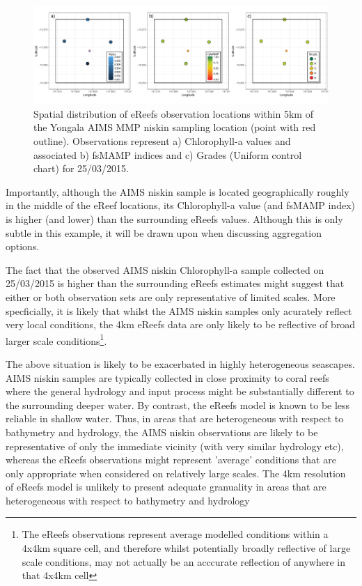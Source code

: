 \begin{figure}[!hptb]
  \includegraphics[width=\textwidth]{figures/FocalAreas/focalArea_Spatial.Yongala_Measure.chl.pdf}
    \caption{Spatial distribution of eReefs observation locations within 5km of the Yongala AIMS MMP niskin sampling location (point with red outline).  Observations represent a) Chlorophyll-a values and associated b) fsMAMP indices and c) Grades (Uniform control chart) for 25/03/2015.}\label{fig:focalArea_Spatial.Yongala_Measure.chl}
\end{figure}

Importantly, although the AIMS niskin sample is located geographically roughly in the middle of the
eReef locations, its Chlorophyll-a value (and fsMAMP index) is higher (and lower) than the surrounding
eReefs values.  Although this is only subtle in this example, it will be drawn upon when discussing
aggregation options.

The fact that the observed AIMS niskin Chlorophyll-a sample collected on 25/03/2015 is
higher than the surrounding eReefs estimates might suggest that either or both observation
sets are only representative of limited scales.  More specficially, it is likely that whilst the
AIMS niskin samples only acurately reflect very local conditions, the 4km eReefs data are
only likely to be reflective of broad larger scale conditions\footnote{The eReefs observations represent
  average modelled conditions within a 4x4km square cell, and therefore whilst potentially broadly reflective
  of large scale conditions, may not actually be an acccurate reflection of anywhere in that 4x4km cell}.

The above situation is likely to be exacerbated in highly heterogeneous seascapes.
AIMS niskin
samples are typically collected in close proximity to coral reefs where the general hydrology
and input process might be substantially different to the surrounding deeper water.  By contrast,
the eReefs model is known to be less reliable in shallow water.  Thus, in areas that are
heterogeneous with respect to bathymetry and hydrology, the AIMS niskin observations are
likely to be representative of only the immediate vicinity (with very similar hydrology etc),
whereas the eReefs observations might represent 'average' conditions that are only appropriate
when considered on relatively large scales. The 4km resolution of eReefs model is unlikely to present adequate granuality in areas that
are heterogeneous with respect to bathymetry and hydrology

